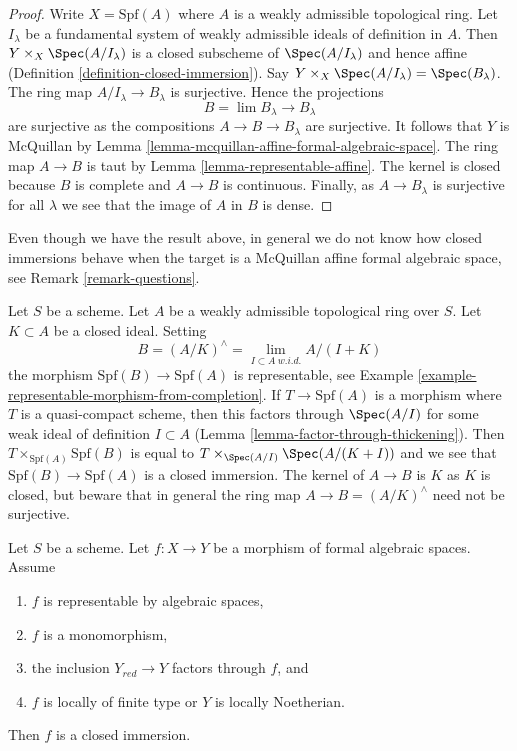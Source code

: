 \begin{proof}
Write $X = \text{Spf}(A)$ where $A$ is a weakly admissible topological ring.
Let $I_\lambda$ be a fundamental system of weakly admissible ideals
of definition in $A$. Then $Y \times_X \Spec(A/I_\lambda)$ is
a closed subscheme of $\Spec(A/I_\lambda)$
and hence affine (Definition \ref{definition-closed-immersion}).
Say $Y \times_X \Spec(A/I_\lambda) = \Spec(B_\lambda)$.
The ring map $A/I_\lambda \to B_\lambda$
is surjective. Hence the projections
$$
B = \lim B_\lambda \longrightarrow B_\lambda
$$
are surjective as the compositions $A \to B \to B_\lambda$ are surjective.
It follows that $Y$ is McQuillan by
Lemma \ref{lemma-mcquillan-affine-formal-algebraic-space}.
The ring map $A \to B$ is taut by Lemma \ref{lemma-representable-affine}.
The kernel is closed because $B$ is complete and $A \to B$ is
continuous. Finally, as $A \to B_\lambda$ is surjective for all $\lambda$
we see that the image of $A$ in $B$ is dense.
\end{proof}

\noindent
Even though we have the result above, in general we do not know how
closed immersions behave when the target is a
McQuillan affine formal algebraic space, see Remark \ref{remark-questions}.

\begin{example}
\label{example-closed-immersion-from-quotient}
Let $S$ be a scheme. Let $A$ be a weakly admissible topological ring over $S$.
Let $K \subset A$ be a closed ideal. Setting
$$
B = (A/K)^\wedge = \lim_{I \subset A\ w.i.d.} A/(I + K)
$$
the morphism $\text{Spf}(B) \to \text{Spf}(A)$ is representable, see
Example \ref{example-representable-morphism-from-completion}.
If $T \to \text{Spf}(A)$ is a morphism where $T$ is a quasi-compact
scheme, then this factors through $\Spec(A/I)$ for some weak
ideal of definition $I \subset A$ (Lemma \ref{lemma-factor-through-thickening}).
Then $T \times_{\text{Spf}(A)} \text{Spf}(B)$
is equal to $T \times_{\Spec(A/I)} \Spec(A/(K + I))$ and
we see that $\text{Spf}(B) \to \text{Spf}(A)$ is a closed immersion.
The kernel of $A \to B$ is $K$ as $K$ is closed, but
beware that in general the ring map $A \to B = (A/K)^\wedge$
need not be surjective.
\end{example}

\begin{lemma}
\label{lemma-monomorphism-iso-over-red}
Let $S$ be a scheme. Let $f : X \to Y$ be a morphism of formal algebraic
spaces. Assume
\begin{enumerate}
\item $f$ is representable by algebraic spaces,
\item $f$ is a monomorphism,
\item the inclusion $Y_{red} \to Y$ factors through $f$, and
\item $f$ is locally of finite type or $Y$ is locally Noetherian.
\end{enumerate}
Then $f$ is a closed immersion.
\end{lemma}

